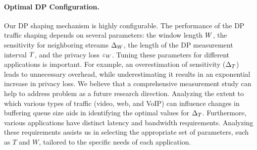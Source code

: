 \paragraph{Optimal DP Configuration.}
Our DP shaping mechanism is highly configurable. 
The performance of the DP traffic shaping depends on several parameters: the window length $W$, the sensitivity for neighboring streams $\Delta_{W}$, the length of the DP measurement interval $T$, and the privacy loss $\varepsilon_{W}$.
Tuning these parameters for different applications is important.
For example, an overestimation of sensitivity ($\Delta_T$) leads to unnecessary overhead, while underestimating it results in an exponential increase in privacy loss.
We believe that a comprehensive measurement study can help to address problem as a future research direction. 
Analyzing the extent to which various types of traffic (\eg video, web, and VoIP) can influence changes in buffering queue size aids in identifying the optimal values for $\Delta_T$.
Furthermore, various applications have distinct latency and bandwidth requirements. Analyzing these requirements assists us in selecting the appropriate set of parameters, such as $T$ and $W$, tailored to the specific needs of each application.